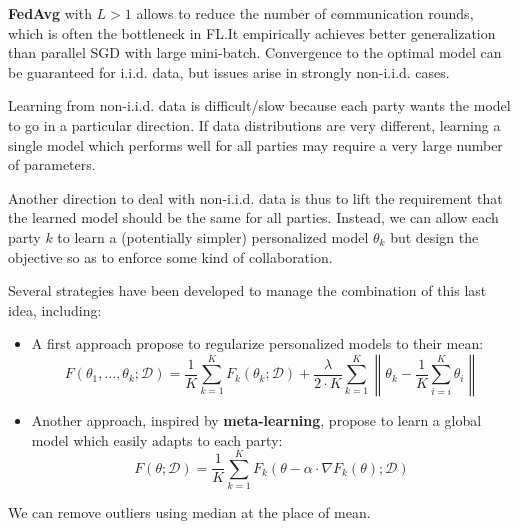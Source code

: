 \textbf{FedAvg} with $L > 1$ allows to reduce the number of communication rounds,
which is often the bottleneck in FL.It empirically achieves better generalization
than parallel SGD with large mini-batch. Convergence to the optimal model can be
guaranteed for i.i.d. data, but issues arise in strongly non-i.i.d. cases.

Learning from non-i.i.d. data is difficult/slow because each party wants the model
to go in a particular direction. If data distributions are very different, learning
a single model which performs well for all parties may require a very large number
of parameters.

Another direction to deal with non-i.i.d. data is thus to lift the requirement
that the learned model should be the same for all parties. Instead, we can allow
each party $k$ to learn a (potentially simpler) personalized model $\theta_k$
but design the objective so as to enforce some kind of collaboration.

Several strategies have been developed to manage the combination of this last
idea, including:
\begin{itemize}
    \item A first approach propose to regularize personalized models to their mean:
          \begin{equation}
              F(\theta_1, \dots, \theta_k; \mathcal{D}) = \frac{1}{K} \sum_{k = 1}^K F_k(\theta_k; \mathcal{D}) + \frac{\lambda}{2 \cdot K} \sum_{k = 1}^K \left\|\theta_k - \frac{1}{K} \sum_{i = i}^K \theta_i\right\|
          \end{equation}
    \item Another approach, inspired by \textbf{meta-learning}, propose to learn
          a global model which easily adapts to each party:
          \begin{equation}
              F(\theta; \mathcal{D}) = \frac{1}{K} \sum_{k = 1}^K F_k(\theta - \alpha \cdot \nabla F_k(\theta); \mathcal{D})
          \end{equation}
\end{itemize}

We can remove outliers using median at the place of mean.